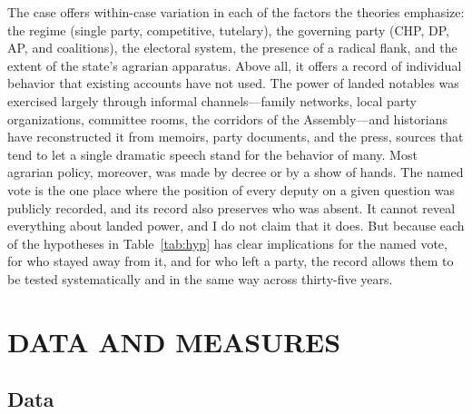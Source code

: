\documentclass[12pt]{article}
\begin{document}
The case offers within-case variation in each of the factors the theories emphasize: the regime (single party, competitive, tutelary), the governing party (CHP, DP, AP, and coalitions), the electoral system, the presence of a radical flank, and the extent of the state's agrarian apparatus. Above all, it offers a record of individual behavior that existing accounts have not used. The power of landed notables was exercised largely through informal channels---family networks, local party organizations, committee rooms, the corridors of the Assembly---and historians have reconstructed it from memoirs, party documents, and the press, sources that tend to let a single dramatic speech stand for the behavior of many. Most agrarian policy, moreover, was made by decree or by a show of hands. The named vote is the one place where the position of every deputy on a given question was publicly recorded, and its record also preserves who was absent. It cannot reveal everything about landed power, and I do not claim that it does. But because each of the hypotheses in Table~\ref{tab:hyp} has clear implications for the named vote, for who stayed away from it, and for who left a party, the record allows them to be tested systematically and in the same way across thirty-five years.

\section*{DATA AND MEASURES}

\subsection*{Data}
\end{document}
